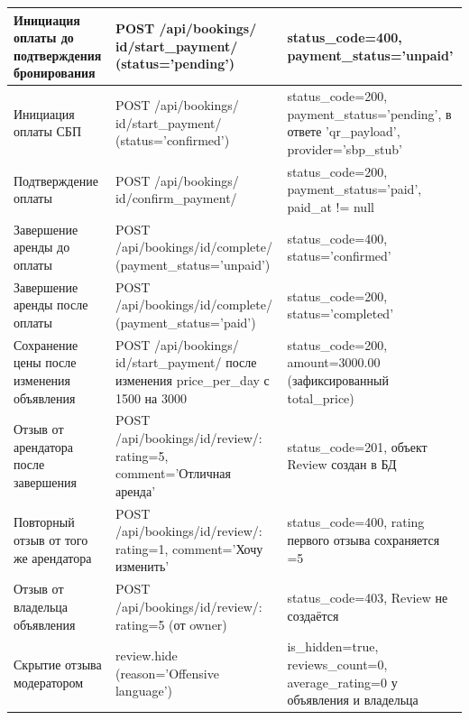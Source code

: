 \begin{xltabular}{\textwidth}{|p{3.5cm}|p{5.5cm}|X|}
    Инициация оплаты до подтверждения бронирования &
    POST /api/bookings/
    {id}/start\_payment/ (status='pending') &
    status\_code=400, payment\_status='unpaid' \\ \hline

    Инициация оплаты СБП &
    POST /api/bookings/
    {id}/start\_payment/ (status='confirmed') &
    status\_code=200, payment\_status='pending', в ответе 'qr\_payload', provider='sbp\_stub' \\ \hline

    Подтверждение оплаты &
    POST /api/bookings/
    {id}/confirm\_payment/ &
    status\_code=200, payment\_status='paid', paid\_at != null \\ \hline

    Завершение аренды до оплаты &
    POST /api/bookings/{id}/complete/ (payment\_status='unpaid') &
    status\_code=400, status='confirmed' \\ \hline

    Завершение аренды после оплаты &
    POST /api/bookings/{id}/complete/ (payment\_status='paid') &
    status\_code=200, status='completed' \\ \hline

    Сохранение цены после изменения объявления &
    POST /api/bookings/
    {id}/start\_payment/ после изменения price\_per\_day с 1500 на 3000 &
    status\_code=200, amount=3000.00 (зафиксированный total\_price) \\ \hline

    Отзыв от арендатора после завершения &
    POST /api/bookings/{id}/review/: rating=5, comment='Отличная аренда' &
    status\_code=201, объект Review создан в БД \\ \hline

    Повторный отзыв от того же арендатора &
    POST /api/bookings/{id}/review/: rating=1, comment='Хочу изменить' &
    status\_code=400, rating первого отзыва сохраняется =5 \\ \hline

    Отзыв от владельца объявления &
    POST /api/bookings/{id}/review/: rating=5 (от owner) &
    status\_code=403, Review не создаётся \\ \hline

    Скрытие отзыва модератором &
    review.hide
    (reason='Offensive language') &
    is\_hidden=true, reviews\_count=0, average\_rating=0 у объявления и владельца \\ \hline

\end{xltabular}
\renewcommand{\arraystretch}{1.0}
